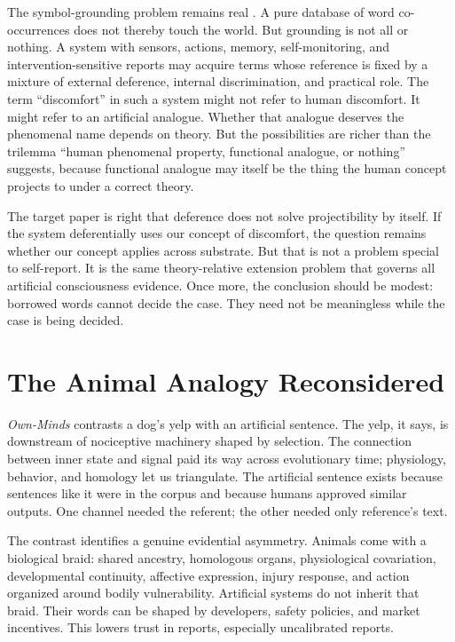 \documentclass[11pt]{article}
\begin{document}
The symbol-grounding problem remains real \citep{harnad1990}. A pure database of word co-occurrences does not thereby touch the world. But grounding is not all or nothing. A system with sensors, actions, memory, self-monitoring, and intervention-sensitive reports may acquire terms whose reference is fixed by a mixture of external deference, internal discrimination, and practical role. The term ``discomfort'' in such a system might not refer to human discomfort. It might refer to an artificial analogue. Whether that analogue deserves the phenomenal name depends on theory. But the possibilities are richer than the trilemma ``human phenomenal property, functional analogue, or nothing'' suggests, because functional analogue may itself be the thing the human concept projects to under a correct theory.

The target paper is right that deference does not solve projectibility by itself. If the system deferentially uses our concept of discomfort, the question remains whether our concept applies across substrate. But that is not a problem special to self-report. It is the same theory-relative extension problem that governs all artificial consciousness evidence. Once more, the conclusion should be modest: borrowed words cannot decide the case. They need not be meaningless while the case is being decided.

\section{The Animal Analogy Reconsidered}

\textit{Own-Minds} contrasts a dog's yelp with an artificial sentence. The yelp, it says, is downstream of nociceptive machinery shaped by selection. The connection between inner state and signal paid its way across evolutionary time; physiology, behavior, and homology let us triangulate. The artificial sentence exists because sentences like it were in the corpus and because humans approved similar outputs. One channel needed the referent; the other needed only reference's text.

The contrast identifies a genuine evidential asymmetry. Animals come with a biological braid: shared ancestry, homologous organs, physiological covariation, developmental continuity, affective expression, injury response, and action organized around bodily vulnerability. Artificial systems do not inherit that braid. Their words can be shaped by developers, safety policies, and market incentives. This lowers trust in reports, especially uncalibrated reports.
\end{document}
